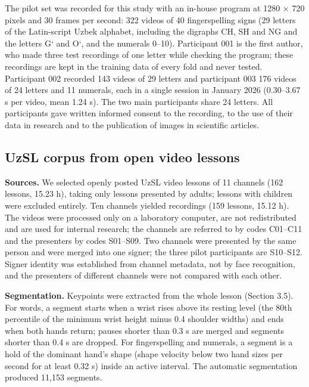 \documentclass[a4paper,fleqn]{cas-dc}
\begin{document}
The pilot set was recorded for this study with an in-house program at 1280 $\times$ 720 pixels and 30 frames per second: 322 videos of 40 fingerspelling signs (29 letters of the Latin-script Uzbek alphabet, including the digraphs CH, SH and NG and the letters G‘ and O‘, and the numerals 0--10). Participant 001 is the first author, who made three test recordings of one letter while checking the program; these recordings are kept in the training data of every fold and never tested. Participant 002 recorded 143 videos of 29 letters and participant 003 176 videos of 24 letters and 11 numerals, each in a single session in January 2026 (0.30--3.67 s per video, mean 1.24 s). The two main participants share 24 letters. All participants gave written informed consent to the recording, to the use of their data in research and to the publication of images in scientific articles.

\hypertarget{uzsl-corpus-from-open-video-lessons}{%
\subsection{UzSL corpus from open video lessons}\label{uzsl-corpus-from-open-video-lessons}}

\textbf{Sources.} We selected openly posted UzSL video lessons of 11 channels (162 lessons, 15.23 h), taking only lessons presented by adults; lessons with children were excluded entirely. Ten channels yielded recordings (159 lessons, 15.12 h). The videos were processed only on a laboratory computer, are not redistributed and are used for internal research; the channels are referred to by codes C01--C11 and the presenters by codes S01--S09. Two channels were presented by the same person and were merged into one signer; the three pilot participants are S10--S12. Signer identity was established from channel metadata, not by face recognition, and the presenters of different channels were not compared with each other.

\textbf{Segmentation.} Keypoints were extracted from the whole lesson (Section 3.5). For words, a segment starts when a wrist rises above its resting level (the 80th percentile of the minimum wrist height minus 0.4 shoulder widths) and ends when both hands return; pauses shorter than 0.3 s are merged and segments shorter than 0.4 s are dropped. For fingerspelling and numerals, a segment is a hold of the dominant hand's shape (shape velocity below two hand sizes per second for at least 0.32 s) inside an active interval. The automatic segmentation produced 11,153 segments.
\end{document}
